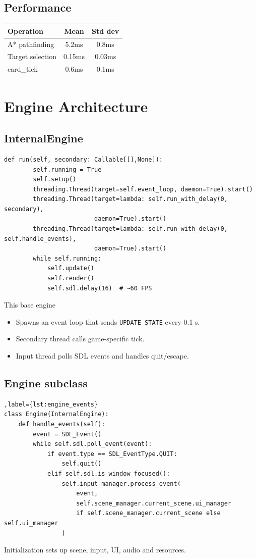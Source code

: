 \documentclass[11pt,a4paper]{article}
\begin{document}
\subsection{Performance}
\begin{longtable}{@{}lcc@{}}
\toprule
  Operation & Mean & Std dev \\ \midrule
  A* pathfinding & 5.2ms & 0.8ms \\
  Target selection & 0.15ms & 0.03ms \\
  card\_tick & 0.6ms & 0.1ms \\ \bottomrule
\end{longtable}

\section{Engine Architecture}
\subsection{InternalEngine}
\begin{lstlisting}[caption={\texttt{InternalEngine.run} loop and threads}]
    def run(self, secondary: Callable[[],None]):
        self.running = True
        self.setup()
        threading.Thread(target=self.event_loop, daemon=True).start()
        threading.Thread(target=lambda: self.run_with_delay(0, secondary),
                         daemon=True).start()
        threading.Thread(target=lambda: self.run_with_delay(0, self.handle_events),
                         daemon=True).start()
        while self.running:
            self.update()
            self.render()
            self.sdl.delay(16)  # ~60 FPS
\end{lstlisting}
This base engine 
\begin{itemize}[nosep]
  \item Spawns an event loop that sends \texttt{UPDATE\_STATE} every 0.1 s.
  \item Secondary thread calls game‐specific tick.
  \item Input thread polls SDL events and handles quit/escape.
\end{itemize}

\subsection{Engine subclass}
\begin{lstlisting}[caption={\texttt{Engine.handle\_events} override}],label={lst:engine_events}
class Engine(InternalEngine):
    def handle_events(self):
        event = SDL_Event()
        while self.sdl.poll_event(event):
            if event.type == SDL_EventType.QUIT:
                self.quit()
            elif self.sdl.is_window_focused():
                self.input_manager.process_event(
                    event,
                    self.scene_manager.current_scene.ui_manager
                    if self.scene_manager.current_scene else self.ui_manager
                )
\end{lstlisting}
Initialization sets up scene, input, UI, audio and resources.
\end{document}

